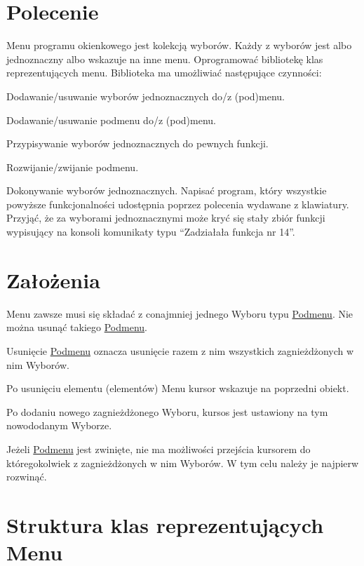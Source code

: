 \section*{Polecenie}

Menu programu okienkowego jest kolekcją wyborów. Każdy z wyborów jest albo jednoznaczny albo wskazuje na inne menu. Oprogramować bibliotekę klas reprezentujących menu. Biblioteka ma umożliwiać następujące czynności\-:
\begin{DoxyItemize}
\item Dodawanie/usuwanie wyborów jednoznacznych do/z (pod)menu.
\item Dodawanie/usuwanie podmenu do/z (pod)menu.
\item Przypisywanie wyborów jednoznacznych do pewnych funkcji.
\item Rozwijanie/zwijanie podmenu.
\item Dokonywanie wyborów jednoznacznych. Napisać program, który wszystkie powyższe funkcjonalności udostępnia poprzez polecenia wydawane z klawiatury. Przyjąć, że za wyborami jednoznacznymi może kryć się stały zbiór funkcji wypisujący na konsoli komunikaty typu “\-Zadziałała funkcja nr 14”.
\end{DoxyItemize}

\section*{Założenia}


\begin{DoxyEnumerate}
\item Menu zawsze musi się składać z conajmniej jednego Wyboru typu \hyperlink{classPodmenu}{Podmenu}. Nie można usunąć takiego \hyperlink{classPodmenu}{Podmenu}.
\item Usunięcie \hyperlink{classPodmenu}{Podmenu} oznacza usunięcie razem z nim wszystkich zagnieżdżonych w nim Wyborów.
\item Po usunięciu elementu (elementów) Menu kursor wskazuje na poprzedni obiekt.
\item Po dodaniu nowego zagnieżdżonego Wyboru, kursos jest ustawiony na tym nowododanym Wyborze.
\item Jeżeli \hyperlink{classPodmenu}{Podmenu} jest zwinięte, nie ma możliwości przejścia kursorem do któregokolwiek z zagnieżdżonych w nim Wyborów. W tym celu należy je najpierw rozwinąć.
\end{DoxyEnumerate}

\section*{Struktura klas reprezentujących Menu}

